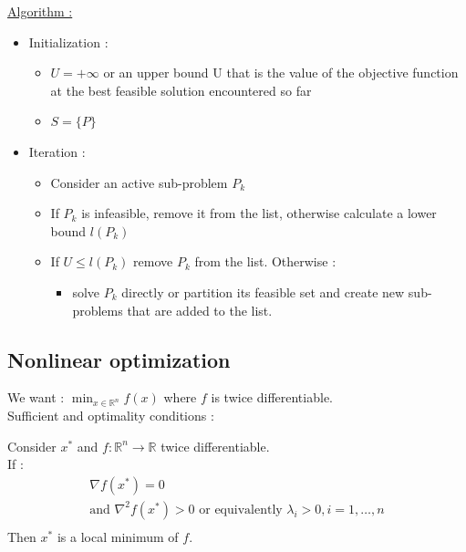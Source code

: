 \documentclass[../main.tex]{subfiles}
\begin{document}
\quad \underline{Algorithm :}\\
\begin{itemize}
    \item Initialization : \begin{itemize}
        \item $U=+\infty$ or an upper bound U that is the value of the objective function at the best feasible solution encountered so far\\
        \item $S = \{P\}$\\
    \end{itemize}
    \item Iteration : \begin{itemize}
        \item Consider an active sub-problem $P_k$\\
        \item If $P_k$ is infeasible, remove it from the list, otherwise calculate a lower bound $l(P_k)$\\
        \item If $U\leq l(P_k)$ remove $P_k$ from the list. Otherwise : \begin{itemize}
            \item solve $P_k$ directly or partition its feasible set and create new sub-problems that are added to the list.\\
        \end{itemize}
    \end{itemize}
\end{itemize}

\subsection{Nonlinear optimization}
We want : $\min_{x\in \mathbb{R}^n} f(x)$ where $f$ is twice differentiable.\\
Sufficient and optimality conditions :\\
\begin{theoremen}
    Consider $x^*$ and $f : \mathbb{R}^n \rightarrow \mathbb{R}$ twice differentiable.\\
    If : \begin{equation}
    \begin{gathered}
        \nabla f(x^*) = 0\\
        \text{and } \nabla^2 f(x^*) > 0 \text{ or equivalently } \lambda_i > 0, i=1,\dots, n\\
        \end{gathered}
    \end{equation}
    Then $x^*$ is a local minimum of $f$.\\
\end{theoremen}
\end{document}
